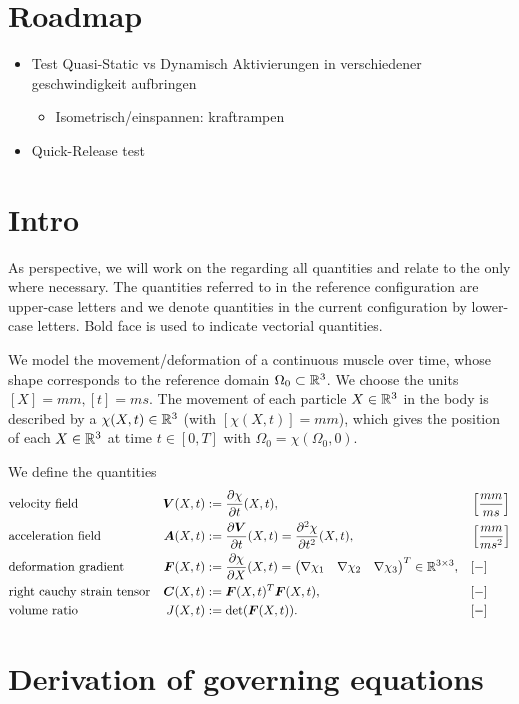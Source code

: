 \documentclass[a4paper,11pt]{article}
\newcommand{\Or}{\Omega_0}
\newcommand{\m}[1]{\ensuremath{\left(\begin{matrix}#1\end{matrix}\right)}}
\begin{document}
\section{Roadmap}
\begin{itemize}
  \item Test Quasi-Static vs Dynamisch
  Aktivierungen in verschiedener geschwindigkeit aufbringen
  	\begin{itemize}
	  \item Isometrisch/einspannen: kraftrampen 
	\end{itemize} 
  \item Quick-Release test
\end{itemize}

\section{Intro}
As perspective, we will work on the  regarding all quantities and relate to the  only where necessary.
The quantities referred to in the reference configuration are upper-case letters and we denote quantities in the current configuration by lower-case letters.
Bold face is used to indicate vectorial quantities.

We model the movement/deformation of a continuous muscle over time, whose shape corresponds to the reference domain $\Or\subset\R^3$.
We choose the units $[X] = mm, [t] = ms$.
The movement of each particle $X\in\mathbb{R}^3$ in the body is described by a  $\chi(X,t)\in\mathbb{R}^3$ (with $[\chi(X,t)] = mm$),
which gives the position of each $X\in\mathbb{R}^3$ at time $t\in[0,T]$ with $\Or = \chi(\Or,0)$.

We define the quantities
\begin{align}
	&\text{velocity field} & \vV(X,t) &:= \d{\chi}{t}(X,t), && \left[\frac{mm}{ms}\right]\\
	&\text{acceleration field} & \vA(X,t) &:= \d{\vV}{t}(X,t) = \dd{\chi}{t}(X,t), && \left[\frac{mm}{ms^2}\right]\\
	&\text{deformation gradient} & \vF(X,t) &:= \d{\chi}{X}(X,t) = \m{\nabla \chi_1 & \nabla \chi_2 & \nabla \chi_3}^T \in \R^{3\times 3}, && [-]\\
	&\text{right cauchy strain tensor} & \vC(X,t) &:= \vF(X,t)^T\vF(X,t), && [-]\\
	&\text{volume ratio} & J(X,t) &:= \det(\vF(X,t)). && [-]
\end{align}

\section{Derivation of governing equations}

\end{document}
